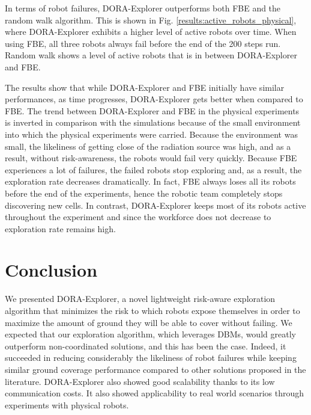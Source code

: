 \documentclass[letterpaper, 10 pt, conference]{ieeeconf}
\begin{document}
In terms of robot failures, DORA-Explorer outperforms both FBE and the random
walk algorithm. This is shown in
Fig. \ref{results:active_robots_physical}, where DORA-Explorer exhibits a
higher level of active robots over time. When using FBE, all three
robots always fail before the end of the 200 steps run. Random walk
shows a level of active robots that is in between DORA-Explorer and FBE.

The results show that while DORA-Explorer and FBE initially have similar performances, as time progresses,
DORA-Explorer gets better when compared to FBE. The trend between DORA-Explorer and FBE in the physical experiments is inverted in comparison with the simulations because of the small environment into which the physical experiments were carried. Because the environment was small, the likeliness of getting close of the radiation source was high, and as a result, without risk-awareness, the robots would fail very quickly. Because FBE
experiences a lot of failures, the failed robots stop exploring and, as
a result, the exploration rate decreases dramatically. In fact, FBE
always loses all its robots before the end of the experiments, hence
the robotic team completely stops discovering new cells. In contrast,
DORA-Explorer keeps most of its robots active throughout the experiment and
since the workforce does not decrease to exploration rate remains
high.

\section{Conclusion}
We presented DORA-Explorer, a novel lightweight risk-aware exploration
algorithm that minimizes the risk to which robots expose themselves in
order to maximize the amount of ground they will be able to cover
without failing. We expected that our exploration algorithm, which
leverages DBMs, would greatly outperform non-coordinated solutions,
and this has been the case. Indeed, it succeeded in reducing
considerably the likeliness of robot failures while keeping similar
ground coverage performance compared to other solutions proposed in
the literature. DORA-Explorer also showed good scalability thanks to its low
communication costs. It also showed applicability to real world
scenarios through experiments with physical robots.
\end{document}
